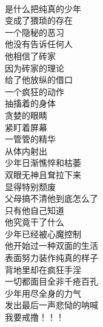 \begin{poem}[少年的沉沦]
    \begin{multicols}{3}
        \centering~\\
        是什么把纯真的少年 \\ 变成了猥琐的存在 \\ 一个隐秘的恶习 \\ 他没有告诉任何人 \\ 他相信了砖家 \\ 因为砖家的理论 \\ 给了他放纵的借口 \\ 一个疯狂的动作 \\ 抽搐着的身体 \\ 贪婪的眼睛 \\ 紧盯着屏幕 \\ 一管管的精华 \\ 从体内射出 \\ 少年日渐憔悴和枯萎 \\ 双眼无神且耷拉下来 \\ 显得特别颓废 \\ 父母搞不清他到底怎么了 \\ 只有他自己知道 \\ 他究竟干了什么 \\ 少年已经被心魔控制 \\ 他开始过一种双面的生活 \\ 表面努力装作纯真的样子 \\ 背地里却在疯狂手淫 \\ 一切都面目全非千疮百孔 \\ 少年用尽全身的力气 \\ 发出最后一声悲恸的呐喊 \\ 我要戒撸！！！
    \end{multicols}
\end{poem}

